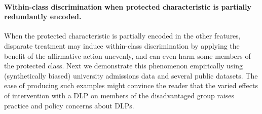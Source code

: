 \paragraph{Within-class discrimination when protected characteristic is partially redundantly encoded.}
When the protected characteristic is partially encoded in the other features, disparate treatment may induce within-class discrimination by applying the benefit of the affirmative action unevenly, and can even harm some members of the protected class.
Next
we demonstrate this phenomenon empirically using 
(synthetically biased) university admissions data and several public datasets. 
The ease of producing such examples might convince the reader that the 
varied effects of intervention with a DLP 
on members of the disadvantaged group raises practice and policy concerns about DLPs.

